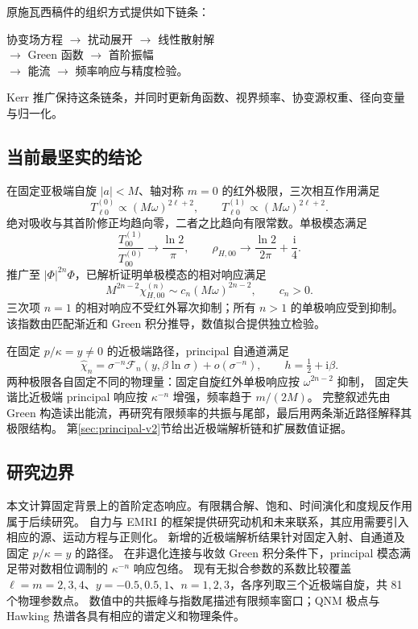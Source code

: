 \documentclass[UTF8,fontset=fandol,11pt,a4paper]{ctexart}
\newcommand{\ii}{\mathrm{i}}
\numberwithin{equation}{section}
\begin{document}
原施瓦西稿件的组织方式\cite{HeTianZhangManuscript2026}提供如下链条：
\begin{center}
协变场方程 $\longrightarrow$ 扰动展开 $\longrightarrow$ 线性散射解\\
$\longrightarrow$ Green 函数 $\longrightarrow$ 首阶振幅\\
$\longrightarrow$ 能流 $\longrightarrow$ 频率响应与精度检验。
\end{center}
Kerr 推广保持这条链条，并同时更新角函数、视界频率、协变源权重、径向变量与归一化。

\subsection{当前最坚实的结论}
在固定亚极端自旋 $|a|<M$、轴对称 $m=0$ 的红外极限，三次相互作用满足
\begin{equation}
T^{(0)}_{\ell0}\propto(M\omega)^{2\ell+2},\qquad
T^{(1)}_{\ell0}\propto(M\omega)^{2\ell+2}.
\end{equation}
绝对吸收与其首阶修正均趋向零，二者之比趋向有限常数。单极模态满足
\begin{equation}
\frac{T^{(1)}_{00}}{T^{(0)}_{00}}\longrightarrow\frac{\ln2}{\pi},\qquad
\rho_{H,00}\longrightarrow\frac{\ln2}{2\pi}+\frac{\ii}{4}.
\end{equation}
推广至 $|\Phi|^{2n}\Phi$，已解析证明单极模态的相对响应满足
\begin{equation}
M^{2n-2}\chi^{(n)}_{H,00}\sim c_n(M\omega)^{2n-2},\qquad c_n>0.
\end{equation}
三次项 $n=1$ 的相对响应不受红外幂次抑制；所有 $n>1$ 的单极响应受到抑制。
该指数由匹配渐近和 Green 积分推导，数值拟合提供独立检验。

在固定 $p/\kappa=y\ne0$ 的近极端路径，principal 自通道满足
\begin{equation}
\widehat\chi_n=\sigma^{-n}\mathcal F_n(y,\beta\ln\sigma)+o(\sigma^{-n}),
\qquad h=\tfrac12+\ii\beta.
\end{equation}
两种极限各自固定不同的物理量：固定自旋红外单极响应按 $\omega^{2n-2}$ 抑制，
固定失谐比近极端 principal 响应按 $\kappa^{-n}$ 增强，频率趋于 $m/(2M)$。
完整叙述先由 Green 构造读出能流，再研究有限频率的共振与尾部，最后用两条渐近路径解释其极限结构。
第\ref{sec:principal-v2}节给出近极端解析链和扩展数值证据。

\subsection{研究边界}
本文计算固定背景上的首阶定态响应。有限耦合解、饱和、时间演化和度规反作用属于后续研究。
自力与 EMRI 的框架\cite{BarackPound2019,PoundWardell2021}提供研究动机和未来联系，其应用需要引入相应的源、运动方程与正则化。
新增的近极端解析结果针对固定入射、自通道及固定 $p/\kappa=y$ 的路径。
在非退化连接与收敛 Green 积分条件下，principal 模态满足带对数相位调制的 $\kappa^{-n}$ 响应包络。
现有无拟合参数的系数比较覆盖 $\ell=m=2,3,4$、$y=-0.5,0.5,1$、$n=1,2,3$，各序列取三个近极端自旋，共 81 个物理参数点。
数值中的共振峰与指数尾描述有限频率窗口；QNM 极点与 Hawking 热谱各具有相应的谱定义和物理条件。
\end{document}
